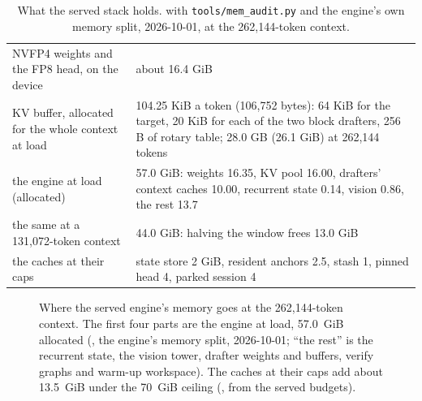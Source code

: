 \begin{table}[htbp]
\centering\small
\caption[What the served stack holds]{What the served stack holds. \measured{} with \texttt{tools/mem\_audit.py} and the engine's own memory split, 2026-10-01, at the 262,144-token context.}\label{tab:memory-split}
\begin{tabularx}{\linewidth}{@{}YL{.42\linewidth}@{}}
\toprule
{} &  \\
\midrule
NVFP4 weights and the FP8 head, on the device & about 16.4 GiB \\
KV buffer, allocated for the whole context at load & 104.25 KiB a token (106,752 bytes): 64 KiB for the target, 20 KiB for each of the two block drafters, 256 B of rotary table; 28.0 GB (26.1 GiB) at 262,144 tokens \\
the engine at load (allocated) & 57.0 GiB: weights 16.35, KV pool 16.00, drafters' context caches 10.00, recurrent state 0.14, vision 0.86, the rest 13.7 \\
the same at a 131,072-token context & 44.0 GiB: halving the window frees 13.0 GiB \\
the caches at their caps & state store 2 GiB, resident anchors 2.5, stash 1, pinned head 4, parked session 4 \\
\bottomrule
\end{tabularx}
\end{table}

\begin{figure}[htbp]
\centering
{}
\caption[Where the engine's memory goes]{Where the served engine's memory goes at the 262,144-token context. The first four parts are the engine at load, 57.0~GiB allocated (\measured, the engine's memory split, 2026-10-01; \enquote{the rest} is the recurrent state, the vision tower, drafter weights and buffers, verify graphs and warm-up workspace). The caches at their caps add about 13.5~GiB under the 70~GiB ceiling (\arith, from the served budgets).}\label{fig:memory-split}
\end{figure}

